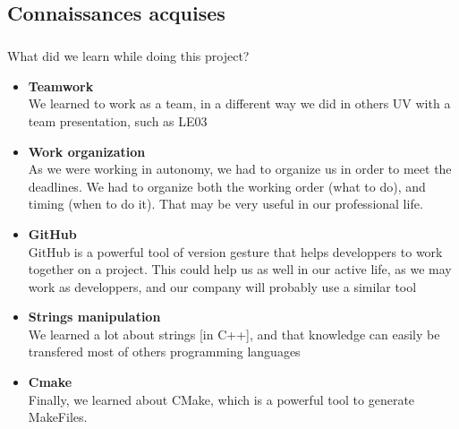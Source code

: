 \documentclass[12pt,a4paper,twoside]{article}
\begin{document}
		\subsection{Connaissances acquises} %
			\subparagraph*{}
				What did we learn while doing this project?
				\begin{itemize}
					\item{} \textbf{Teamwork}\\
						We learned to work as a team, in a different way we did in others UV with a team presentation, such as LE03
					\item{} \textbf{Work organization}\\
						As we were working in autonomy, we had to organize us in order to meet the deadlines. We had to organize both the working order (what to do), and timing (when to do it). That may be very useful in our professional life.
					\item{} \textbf{GitHub}\\
						GitHub is a powerful tool of version gesture that helps developpers to work together on a project. This could help us as well in our active life, as we may work as developpers, and our company will probably use a similar tool
					\item{} \textbf{Strings manipulation}\\
						We learned a lot about strings [in C++], and that knowledge can easily be transfered most of others programming languages
					\item{} \textbf{Cmake}\\
						Finally, we learned about CMake, which is a powerful tool to generate MakeFiles.
				\end{itemize}
\end{document}
